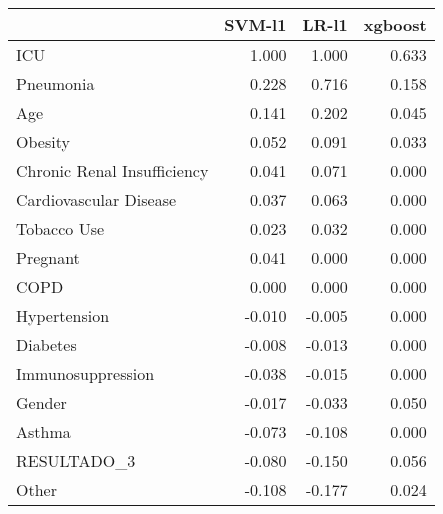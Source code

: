 \begin{tabular}{lrrr}
\toprule
{} &  SVM-l1 &  LR-l1 &  xgboost \\
\midrule
ICU                         &   1.000 &  1.000 &    0.633 \\
Pneumonia                   &   0.228 &  0.716 &    0.158 \\
Age                         &   0.141 &  0.202 &    0.045 \\
Obesity                     &   0.052 &  0.091 &    0.033 \\
Chronic Renal Insufficiency &   0.041 &  0.071 &    0.000 \\
Cardiovascular Disease      &   0.037 &  0.063 &    0.000 \\
Tobacco Use                 &   0.023 &  0.032 &    0.000 \\
Pregnant                    &   0.041 &  0.000 &    0.000 \\
COPD                        &   0.000 &  0.000 &    0.000 \\
Hypertension                &  -0.010 & -0.005 &    0.000 \\
Diabetes                    &  -0.008 & -0.013 &    0.000 \\
Immunosuppression           &  -0.038 & -0.015 &    0.000 \\
Gender                      &  -0.017 & -0.033 &    0.050 \\
Asthma                      &  -0.073 & -0.108 &    0.000 \\
RESULTADO\_3                 &  -0.080 & -0.150 &    0.056 \\
Other                       &  -0.108 & -0.177 &    0.024 \\
\bottomrule
\end{tabular}
